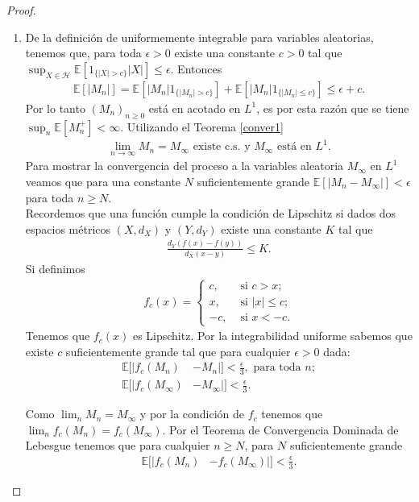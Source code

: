 \begin{proof}
\begin{enumerate}
\item De la definición de uniformemente integrable para variables aleatorias, tenemos que, para toda $\epsilon > 0$ existe una constante $c > 0$ tal que $\sup_{X \in \mathcal{H}} \mathbb{E} [ 1_{ \{|X| > c\} } |X| ] \leq \epsilon$. Entonces
	\begin{align*}
	\mathbb{E}[|M_n|] = \mathbb{E} \left[ |M_n|1_{ \{|M_n| > c\} } \right] + \mathbb{E} \left[ |M_n|1_{ \{|M_n| \leq c\} } \right] \leq \epsilon + c.
	\end{align*}
Por lo tanto $(M_n)_{n \geq 0}$ está en acotado en $L^1$, es por esta razón que se tiene $\sup_n \mathbb{E}[M_n^{+}] < \infty$. Utilizando el Teorema \ref{conver1} 
	\begin{align*}
	\lim_{n \rightarrow \infty} M_n = M_{\infty} \text{ existe c.s. y } M_{\infty} \text{ está en } L^1.
	\end{align*}
Para mostrar la convergencia del proceso a la variables aleatoria $M_{\infty}$ en $L^1$ veamos que para una constante $N$ suficientemente grande $\mathbb{E}[|M_n - M_{\infty}|] < \epsilon$ para toda $n \geq N$. \\

Recordemos que una función cumple la condición de Lipschitz si \cite[p.~169]{bartle} dados dos espacios métricos $(X, d_X)$ y $(Y, d_Y)$ existe una constante $K$ tal que
	\begin{align*}
	\frac{d_Y(f(x) - f(y))}{d_X(x - y)} \leq K.
	\end{align*}
Si definimos 
	\begin{align*}
	f_c(x) = 
	\begin{cases}
	c, & \text{ si } c > x; \\
	x, & \text{ si } |x| \leq c; \\
	-c, & \text{ si } x < -c.
	\end{cases}
	\end{align*}
Tenemos que $f_c(x)$ es Lipschitz. Por la integrabilidad uniforme sabemos que existe $c$ suficientemente grande tal que para cualquier $\epsilon > 0$ dada:
	\begin{align}
	\mathbb{E}[ |f_c(M_n) & - M_n|] < \frac{\epsilon}{3}, \text{ para toda } n; \label{aas} \\
	\mathbb{E}[ |f_c(M_{\infty}) & - M_{\infty}|] < \frac{\epsilon}{3}. \label{aat}
	\end{align}
	
Como $\lim_n M_n = M_{\infty}$ y por la condición de $f_c$ tenemos que $\lim_n f_c(M_n) = f_c(M_{\infty})$. Por el Teorema de Convergencia Dominada de Lebesgue \cite[p.~52]{jacodprotter} tenemos que para cualquier $n \geq N$, para $N$ suficientemente grande
	\begin{align}
	\mathbb{E} [ | f_c(M_n) & - f_c(M_{\infty}) |] < \frac{\epsilon}{3}. \label{aau}
	\end{align}


\end{enumerate}
\end{proof}
